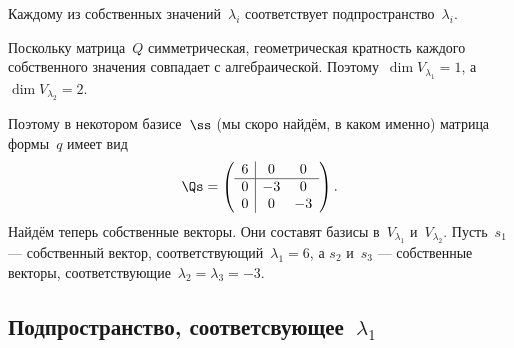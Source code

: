 \begin{solution}
	Каждому из собственных значений~$\lambda_i$ соответствует подпространство~$\lambda_i$.

Поскольку матрица~$Q$ симметрическая, геометрическая кратность каждого собственного значения совпадает с алгебраической. Поэтому~$\dim{V_{\lambda_1}} = 1$, а~$\dim{V_{\lambda_2}} = 2$.

	Поэтому в некотором базисе~$\ss$ (мы скоро найдём, в каком именно) матрица формы~$q$ имеет вид
	\[
		\Qs =
		\left( 
			\begin{array}{c|cc}
				6 & 0 & 0 \\
				\hline
				0 & -3 & 0 \\
				0 & 0 & -3
			\end{array}
		\right)
		.
	\]
	Найдём теперь собственные векторы. Они составят базисы в~$V_{\lambda_1}$ и~$V_{\lambda_2}$. Пусть~$s_1$ --- собственный вектор, соответствующий~$\lambda_1 = 6$, а $s_2$ и~$s_3$ --- собственные векторы, соответствующие~$\lambda_2 = \lambda_3 = -3$.

	\subsection[Подпространство, соответсвующее~$\lambda_1$]{Подпространство, соответсвующее~$\lambda_1$}


\end{solution}
